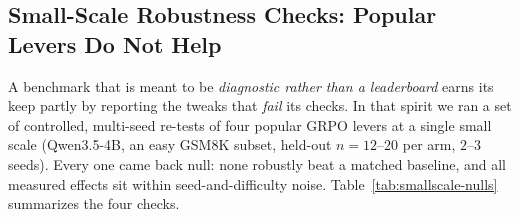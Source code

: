 \documentclass{article}
\begin{document}
\subsection{Small-Scale Robustness Checks: Popular Levers Do Not Help}
\label{sec:smallscale-nulls}

A benchmark that is meant to be \emph{diagnostic rather than a
leaderboard} earns its keep partly by reporting the tweaks that
\emph{fail} its checks. In that spirit we ran a set of controlled,
multi-seed re-tests of four popular GRPO levers at a single small scale
(Qwen3.5-4B, an easy GSM8K subset, held-out $n{=}12$--$20$ per arm,
$2$--$3$ seeds). Every one came back null: none robustly beat a matched
baseline, and all measured effects sit within seed-and-difficulty noise.
Table~\ref{tab:smallscale-nulls} summarizes the four checks.
\end{document}
